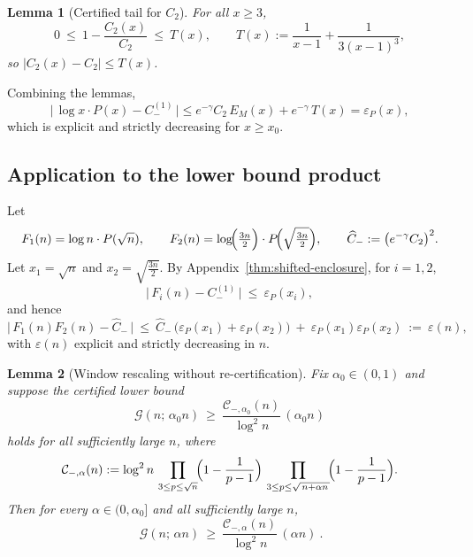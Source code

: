 \documentclass[11pt]{article}
\theoremstyle{inline}
\theoremstyle{break}
\newtheorem{lemma}{Lemma}
\theoremstyle{break}
\theoremstyle{break}
\theoremstyle{break}
\theoremstyle{break}
\theoremstyle{break}
\theoremstyle{break}
\theoremstyle{inline}
\newcommand{\CminusProductAlpha}[2]{\mathcal{C}_{-,#2}\!\left(#1\right)}
\begin{document}
\begin{lemma}[Certified tail for \( C_2 \)]\label{lem:C2-tail}
For all \( x\ge 3 \),
\begin{equation}
0\ \le\ 1-\frac{C_2(x)}{C_2}\ \le\ T(x),
\qquad
T(x) := \frac{1}{x-1}+\frac{1}{3(x-1)^3},
\end{equation}
so \( |C_2(x)-C_2|\le T(x) \).
\end{lemma}

Combining the lemmas,
\begin{equation}
\bigl|\,\log x\cdot P(x) - C_-^{(1)}\,\bigr|
\le e^{-\gamma}C_2\,E_M(x) + e^{-\gamma}\,T(x) = \varepsilon_P(x),
\end{equation}
which is explicit and strictly decreasing for \( x\ge x_0 \).


\subsection*{Application to the lower bound product}
Let
\begin{equation}
F_1(n)=\log n\cdot P(\sqrt{n}),\qquad
F_2(n)=\log\!\Bigl(\tfrac{3n}{2}\Bigr)\cdot P\!\Bigl(\sqrt{\tfrac{3n}{2}}\Bigr),
\qquad
\widehat C_- := \bigl(e^{-\gamma}C_2\bigr)^2 .
\end{equation}
Let \(x_1=\sqrt{n}\) and \(x_2=\sqrt{\frac{3n}{2}}\).
By Appendix~\ref{thm:shifted-enclosure}, for \( i=1,2 \),
\begin{equation}
\bigl|\,F_i(n)-C_-^{(1)}\,\bigr|\ \le\ \varepsilon_P(x_i),
\end{equation}
and hence
\begin{equation}
\bigl|\,F_1(n)F_2(n)-\widehat C_-\,\bigr|
\ \le\ \widehat C_-\,\bigl(\varepsilon_P(x_1)+\varepsilon_P(x_2)\bigr)
\ +\ \varepsilon_P(x_1)\varepsilon_P(x_2)
\ :=\ \varepsilon(n),
\end{equation}
with \( \varepsilon(n) \) explicit and strictly decreasing in \( n \).


\begin{lemma}[Window rescaling without re-certification]
\label{lem:alpha-rescale}
Fix \(\alpha_0\in(0,1)\) and suppose the certified lower bound
\begin{equation}\label{eq:alpha0-certified}
\mathcal G(n;\,\alpha_0 n)\ \ge\ \frac{\CminusProductAlpha{n}{\alpha_0}}{\log^2 n}\,(\alpha_0 n)
\end{equation}
holds for all sufficiently large \(n\), where
\begin{equation}\label{eq:Cminus-alpha-def}
\CminusProductAlpha{n}{\alpha}
:=\log^2 n\,
\prod_{3\le p\le \sqrt n}\!\Bigl(1-\frac{1}{p-1}\Bigr)\,
\prod_{3\le p\le \sqrt{\,n+\alpha n\,}}\!\Bigl(1-\frac{1}{p-1}\Bigr).
\end{equation}
Then for every \(\alpha\in(0,\alpha_0]\) and all sufficiently large \(n\),
\begin{equation}\label{eq:alpha-certified}
\boxed{\ \ \mathcal G(n;\,\alpha n)\ \ge\ \frac{\CminusProductAlpha{n}{\alpha}}{\log^2 n}\,(\alpha n)\ .\ }
\end{equation}
\end{lemma}
\end{document}

